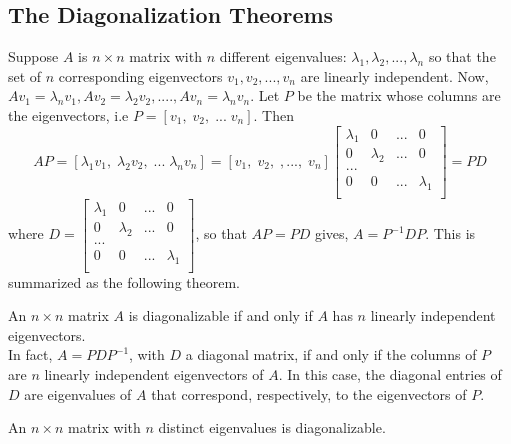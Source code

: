 \documentclass[aima104_lecturenotes_ku.tex]{subfiles}
\begin{document}
\subsection{The Diagonalization Theorems}
Suppose $A$ is $n \times n$ matrix with $n$ different eigenvalues: $\lambda_1, \lambda_2, ..., \lambda_n$ so that the set of $n$ corresponding eigenvectors $v_1, v_2, ..., v_n$ are linearly independent. Now, $Av_1=\lambda _n v_1, Av_2=\lambda _2 v_2, ...., Av_n = \lambda _n v_n$. Let $P$ be the matrix whose columns are the eigenvectors, i.e $P = [v_1, \; v_2, \; ... \; v_n] $. Then
\begin{equation}
  \label{eq:1}
AP = [\lambda _1 v_1, \; \lambda_2 v_2, \; ... \; \lambda_n v_n] =
 [v_1, \; v_2, \; , ..., \; v_n] \begin{bmatrix}
  \lambda_1 & 0 & ... & 0 \\
  0 & \lambda_2 & ... & 0 \\
  ... \\
  0 & 0 & ... & \lambda_1 \\
\end{bmatrix} = PD
\end{equation}
where $ D = \begin{bmatrix}
  \lambda_1 & 0 & ... & 0 \\
  0 & \lambda_2 & ... & 0 \\
  ... \\
  0 & 0 & ... & \lambda_1 \\
\end{bmatrix} $, so that $AP = PD$ gives, $A = P^{-1} D P$. This is summarized as the following theorem.

\setcounter{thm}{2}
\begin{thm}
  An $n \times n$ matrix $A$ is diagonalizable if and only if $A$ has $n$ linearly independent eigenvectors. \\
  In fact, $A = PDP^{-1}$, with $D$ a diagonal matrix, if and only if the columns of $P$ are $n$ linearly independent eigenvectors of $A$. In this case, the diagonal entries of $D$ are eigenvalues of $A$ that correspond, respectively, to the eigenvectors of $P$.
\end{thm}

\setcounter{theorem}{3}
\begin{theorem}
  An $n \times n$ matrix with $n$ distinct eigenvalues is diagonalizable.
\end{theorem}
\end{document}
